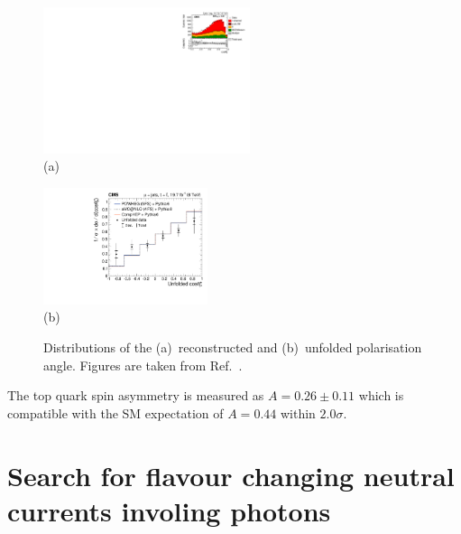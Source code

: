 \documentclass{PoS}
\begin{document}
\begin{figure}[htbp]
\begin{center}
\parbox[t]{0.55\textwidth}{\centering\includegraphics[width=0.54\textwidth]{figures/polarization/2j1t_cos_theta.pdf}\\(a)}
\parbox[t]{0.44\textwidth}{\centering\includegraphics[width=0.43\textwidth]{figures/polarization/cos_theta_unfolded.pdf}\\(b)}
\caption{\label{fig:costheta}Distributions of the (a)~reconstructed and (b)~unfolded polarisation angle. Figures are taken from Ref.~\cite{CMS-PAS-TOP-13-001}.}
\end{center}
\end{figure}

The top quark spin asymmetry is measured as $A=0.26\pm0.11$ which is compatible with the SM expectation of $A=0.44$ within $2.0\sigma$.


\section{Search for flavour changing neutral currents involing photons}
\end{document}
